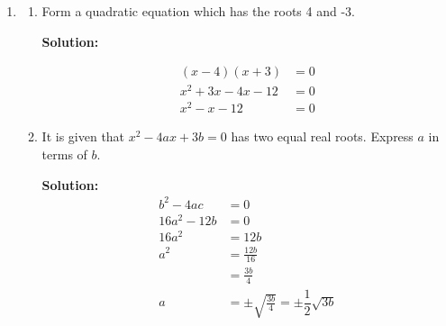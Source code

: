 \documentclass{report}
\newcommand{\sol}{\textbf{Solution:}}
\begin{document}
\begin{enumerate}[leftmargin=*]
\begin{enumerate}
                    \newpage
              \item the values of $x$ when $f g(x)=5$.

                    \sol{}
                    \begin{align*}
                        f g(x)      & = 5               \\
                        f(x^2-3x+5) & = 5               \\
                        x^2-3x+5-4  & = 5               \\
                        x^2-3x-4    & = 0               \\
                        (x-4)(x+1)  & = 0               \\
                        x = -1      & \text{ or } x = 4
                    \end{align*}
          \end{enumerate}

    \item \begin{enumerate}
              \item Form a quadratic equation which has the roots 4 and -3.

                    \sol{}

                    \begin{align*}
                        (x-4)(x+3)   & = 0 \\
                        x^2+3x-4x-12 & = 0 \\
                        x^2-x-12     & = 0
                    \end{align*}

              \item It is given that $x^2-4 a x+3 b=0$ has two equal real roots. Express $a$ in
                    terms of $b$.

                    \sol{}
                    \begin{align*}
                        b^2-4ac   & = 0                                                   \\
                        16a^2-12b & = 0                                                   \\
                        16a^2     & = 12b                                                 \\
                        a^2       & = \frac{12b}{16}                                      \\
                                  & = \frac{3b}{4}                                        \\
                        a         & = \pm \sqrt{\frac{3b}{4}} = \pm \dfrac{1}{2}\sqrt{3b}
                    \end{align*}
          \end{enumerate}


\end{enumerate}
\end{document}
